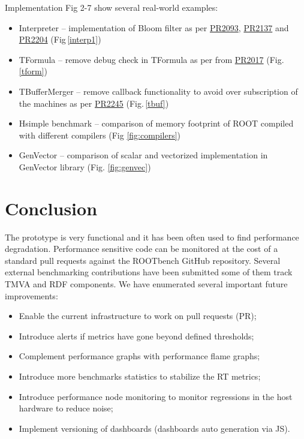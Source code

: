 \documentclass{webofc}
\begin{document}
\begin{block}{Implementation}
Fig 2-7 show several real-world examples:
\begin{itemize}
\item Interpreter -- implementation of Bloom filter as per \href{https://github.com/root-project/root/pull/2093}{PR2093}, \href{https://github.com/root-project/root/pull/2137}{PR2137} and \href{https://github.com/root-project/root/pull/2204}{PR2204} (Fig\,\ref{interp1})
\item TFormula -- remove debug check in TFormula as per from \href{https://github.com/root-project/root/pull/2017}{PR2017} (Fig.\,\ref{tform})
\item TBufferMerger -- remove callback functionality to avoid over subscription of the machines as per \href{https://github.com/root-project/root/pull/2245}{PR2245}  (Fig.\,\ref{tbuf})
\item Hsimple benchmark -- comparison of memory footprint of ROOT compiled with different compilers (Fig \ref{fig:compilers})
\item GenVector -- comparison of scalar and vectorized implementation in GenVector library (Fig. \ref{fig:genvec})
\end{itemize}

\section{Conclusion}
The prototype is very functional and it has been often used to find performance degradation. Performance sensitive code can be monitored at the cost of a standard pull requests against the ROOTbench GitHub repository. Several external benchmarking contributions have been submitted some of them track TMVA and RDF components. We have enumerated several important future improvements:
\begin{itemize}
\item Enable the current infrastructure to work on pull requests (PR);
\item Introduce alerts if metrics have gone beyond defined thresholds;
\item Complement performance graphs with performance flame graphs;
\item Introduce more benchmarks statistics to stabilize the RT metrics;
\item Introduce performance node monitoring to monitor regressions in the host hardware to reduce noise;
\item Implement versioning of dashboards (dashboards auto generation via JS).

\end{itemize}


\end{block}
\end{document}
